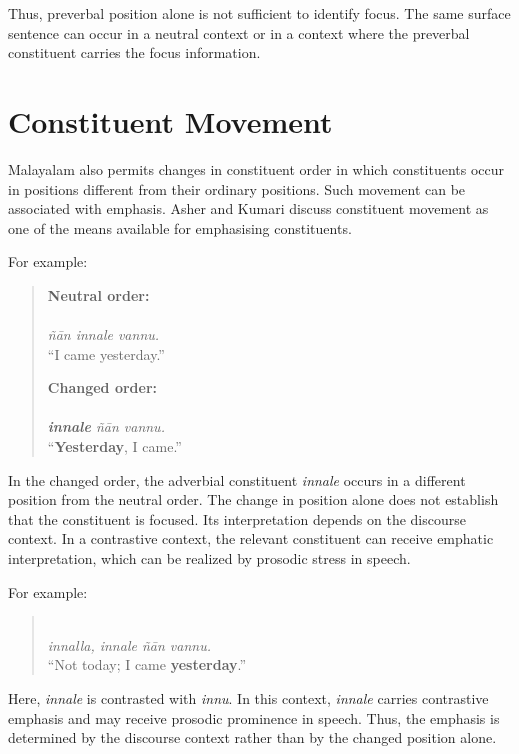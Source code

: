 Thus, preverbal position alone is not sufficient to identify focus. The same surface sentence can occur in a neutral context or in a context where the preverbal constituent carries the focus information.

\section{Constituent Movement}
\label{sec:constituent_movement}

Malayalam also permits changes in constituent order in which constituents occur in positions different from their ordinary positions. Such movement can be associated with emphasis. Asher and Kumari \citep{asher1997malayalam} discuss constituent movement as one of the means available for emphasising constituents.

For example:

\begin{quote}
\textbf{Neutral order:}\\
\\
\textit{ñān innale vannu.}\\
``I came yesterday.''

\textbf{Changed order:}\\
\\
\textit{\textbf{innale} ñān vannu.}\\
``\textbf{Yesterday}, I came.''
\end{quote}

In the changed order, the adverbial constituent \textit{innale} occurs in a different position from the neutral order. The change in position alone does not establish that the constituent is focused. Its interpretation depends on the discourse context. In a contrastive context, the relevant constituent can receive emphatic interpretation, which can be realized by prosodic stress in speech.

For example:

\begin{quote}
\\
\textit{innalla, innale ñān vannu.}\\
``Not today; I came \textbf{yesterday}.''
\end{quote}

Here, \textit{innale} is contrasted with \textit{innu}. In this context, \textit{innale} carries contrastive emphasis and may receive prosodic prominence in speech. Thus, the emphasis is determined by the discourse context rather than by the changed position alone.

